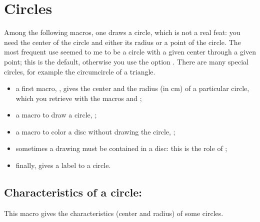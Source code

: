 \newpage
\section{Circles}

Among the following macros, one draws a circle, which is not a real feat: you need the center of the circle and either its radius or a point of the circle. The most frequent use seemed to me to be a circle with a given center through a given point; this is the default, otherwise you use the option . There are many special circles, for example the circumcircle of a triangle.

\begin{itemize}
  \item a first macro, , gives the center and the radius (in cm) of a particular circle, which you retrieve with the macros  and ;
 
 \item a macro to draw a circle, ;
 
 \item a macro to color a disc without drawing the circle, ;
 
 \item sometimes a drawing must be contained in a disc: this is the role of ;
  
 \item finally,  gives a label to a circle.
\end{itemize} 

\subsection{Characteristics of a circle: }
 
This macro gives the characteristics (center and radius) of some circles.

